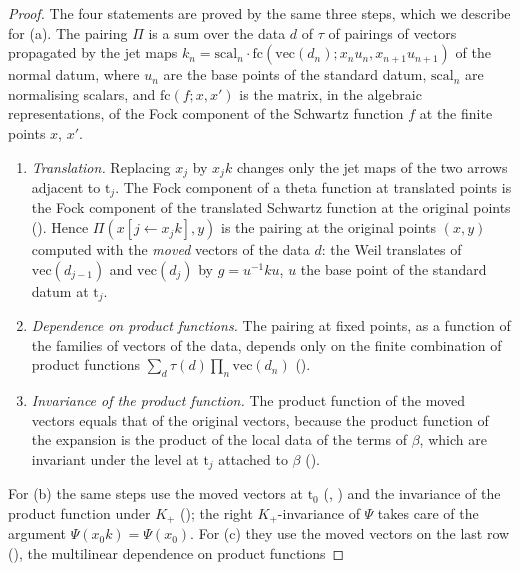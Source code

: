 \begin{proof}
The four statements are proved by the same three steps, which we describe for (a). The pairing $\Pi$ is a sum over the
data $d$ of $\tau$ of pairings of vectors propagated by the jet maps
$k_n=\mathrm{scal}_n\cdot\mathrm{fc}(\mathrm{vec}(d_n);x_nu_n,x_{n+1}u_{n+1})$ of the normal datum, where $u_n$ are the base
points of the standard datum, $\mathrm{scal}_n$ are normalising scalars, and $\mathrm{fc}(f;x,x')$ is the matrix, in the
algebraic representations, of the Fock component of the Schwartz function $f$ at the finite points $x$, $x'$.
\begin{enumerate}[label=(\arabic*)]
\item \emph{Translation.} Replacing $x_j$ by $x_jk$ changes only the jet maps of the two arrows adjacent to $\mathrm t_j$. The
Fock component of a theta function at translated points is the Fock component of the translated Schwartz function at the
original points (). Hence $\Pi(x[j\leftarrow x_jk],y)$ is the pairing
at the original points $(x,y)$ computed with the \emph{moved} vectors of the data $d$: the Weil translates of $\mathrm{vec}(d_{j-1})$
and $\mathrm{vec}(d_j)$ by $g=u^{-1}ku$, $u$ the base point of the standard datum at $\mathrm t_j$.
\item \emph{Dependence on product functions.} The pairing at fixed points, as a function of the families of vectors of the
data, depends only on the finite combination of product functions
$\sum_d\tau(d)\prod_n\mathrm{vec}(d_n)$ ().
\item \emph{Invariance of the product function.} The product function of the moved vectors equals that of the original
vectors, because the product function of the expansion is the product of the local data of the terms of $\beta$, which are
invariant under the level at $\mathrm t_j$ attached to $\beta$ ().
\end{enumerate}
For (b) the same steps use the moved vectors at $\mathrm t_0$ (,
) and the invariance of the product function under $K_+$
(); the right $K_+$-invariance of $\Psi$ takes care of the
argument $\Psi(x_0k)=\Psi(x_0)$. For (c) they use the moved vectors on the last row
(), the multilinear dependence on product functions

\end{proof}
